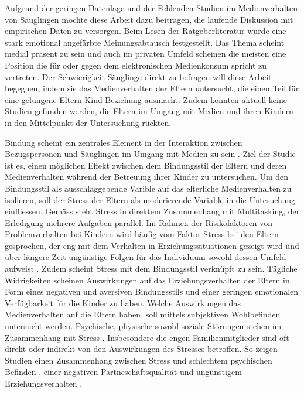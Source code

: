 Aufgrund der geringen Datenlage und der Fehlenden Studien im Medienverhalten von Säuglingen möchte diese Arbeit dazu beitragen, die laufende Diskussion mit empirischen Daten zu versorgen. Beim Lesen der Ratgeberliteratur wurde eine stark emotional angefärbte Meinungsabtausch festgestellt. Das Thema scheint medial präsent zu sein und auch im privaten Umfeld scheinen die meisten eine Position die für oder gegen dem elektronischen Medienkonsum spricht zu vertreten. Der Schwierigkeit Säuglinge direkt zu befragen will diese Arbeit begegnen, indem sie das Medienverhalten der Eltern untersucht, die einen Teil für eine gelungene Eltern-Kind-Beziehung ausmacht. Zudem konnten aktuell keine Studien gefunden werden, die Eltern im Umgang mit Medien und ihren Kindern in den Mittelpunkt der Untersuchung rückten.  

Bindung scheint ein zentrales Element in der Interaktion zwischen Bezugspersonen und Säuglingen im Umgang mit Medien zu sein \cite{Prekop2017, Huether2017, Blikk2017}. Ziel der Studie ist es, einen möglichen Effekt zwischen dem Bindungsstil der Eltern und deren Medienverhalten während der Betreuung ihrer Kinder zu untersuchen. Um den Bindungsstil als ausschlaggebende Varible auf das elterliche Medienverhalten zu isolieren, soll der Stress der Eltern als moderierende Variable in die Untesuchung einfliessen. Gemäss  steht Stress in direktem Zusammenhang mit Multitasking, der Erledigung mehrere Aufgaben parallel. Im Rahmen der Risikofaktoren von Problemverhalten bei Kindern wird häufig vom Faktor Stress bei den Eltern gesprochen, der eng mit dem Verhalten in Erziehungssituationen gezeigt wird und über längere Zeit ungünstige Folgen für das Individuum sowohl dessen Umfeld aufweist \cite{Cina2009}. Zudem scheint Stress mit dem Bindungsstil verknüpft zu sein. Tägliche Widrigkeiten scheinen Auswirkungen auf das Erziehungsverhalten der Eltern in Form eines negativen und aversiven Bindungsstils \cite{Dumas1989, Webster-Stratton1988} und einer geringen emotionalen Verfügbarkeit für die Kinder \cite{Campbell1991} zu haben. Welche Auswirkungen das Medienverhalten auf die Eltern haben, soll mittels subjektiven Wohlbefinden  untersucht werden. Psychische, physische sowohl soziale Störungen stehen im Zusammenhang mit Stress \cite{Elfering2002, Burisch1994}. Insbesondere die engen Familienmitglieder sind oft direkt oder indirekt von den Auswirkungen des Stresses betroffen. So zeigen Studien einen Zusammenhang zwischen Stress und schlechtem psychischen Befinden \cite{Burisch1994, Krohne1997}, einer negativen Partneschaftsqualität \cite{Bodenmann2000, Bodenmann1999, Bodenmann2000a} und ungünstigem Erziehungsverhalten \cite{Abidin1992, Belsky1984, WebsterStratton2000}.

